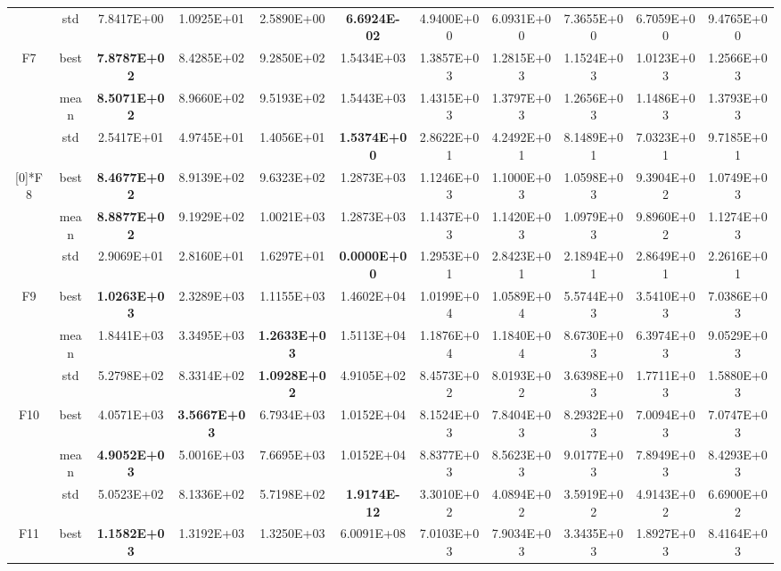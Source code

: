 \documentclass{wzuthesis}
\begin{document}
\begin{longtable}{ccccccccccc}
          & std   & 7.8417E+00 & 1.0925E+01 & 2.5890E+00 & \textbf{6.6924E-02} & 4.9400E+00 & 6.0931E+00 & 7.3655E+00 & 6.7059E+00 & 9.4765E+00 \\
    \multirow{3}[0]{*}{F7} & best  & \textbf{7.8787E+02} & 8.4285E+02 & 9.2850E+02 & 1.5434E+03 & 1.3857E+03 & 1.2815E+03 & 1.1524E+03 & 1.0123E+03 & 1.2566E+03 \\
          & mean  & \textbf{8.5071E+02} & 8.9660E+02 & 9.5193E+02 & 1.5443E+03 & 1.4315E+03 & 1.3797E+03 & 1.2656E+03 & 1.1486E+03 & 1.3793E+03 \\
          & std   & 2.5417E+01 & 4.9745E+01 & 1.4056E+01 & \textbf{1.5374E+00} & 2.8622E+01 & 4.2492E+01 & 8.1489E+01 & 7.0323E+01 & 9.7185E+01 \\
          \vspace*{1\baselineskip} 
    \multirow{3}[0]{*}{F8} & best  & \textbf{8.4677E+02} & 8.9139E+02 & 9.6323E+02 & 1.2873E+03 & 1.1246E+03 & 1.1000E+03 & 1.0598E+03 & 9.3904E+02 & 1.0749E+03 \\
          & mean  & \textbf{8.8877E+02} & 9.1929E+02 & 1.0021E+03 & 1.2873E+03 & 1.1437E+03 & 1.1420E+03 & 1.0979E+03 & 9.8960E+02 & 1.1274E+03 \\
          & std   & 2.9069E+01 & 2.8160E+01 & 1.6297E+01 & \textbf{0.0000E+00} & 1.2953E+01 & 2.8423E+01 & 2.1894E+01 & 2.8649E+01 & 2.2616E+01 \\
    \multirow{3}[0]{*}{F9} & best  & \textbf{1.0263E+03} & 2.3289E+03 & 1.1155E+03 & 1.4602E+04 & 1.0199E+04 & 1.0589E+04 & 5.5744E+03 & 3.5410E+03 & 7.0386E+03 \\
          & mean  & 1.8441E+03 & 3.3495E+03 & \textbf{1.2633E+03} & 1.5113E+04 & 1.1876E+04 & 1.1840E+04 & 8.6730E+03 & 6.3974E+03 & 9.0529E+03 \\
          & std   & 5.2798E+02 & 8.3314E+02 & \textbf{1.0928E+02} & 4.9105E+02 & 8.4573E+02 & 8.0193E+02 & 3.6398E+03 & 1.7711E+03 & 1.5880E+03 \\
    \multirow{3}[0]{*}{F10} & best  & 4.0571E+03 & \textbf{3.5667E+03} & 6.7934E+03 & 1.0152E+04 & 8.1524E+03 & 7.8404E+03 & 8.2932E+03 & 7.0094E+03 & 7.0747E+03 \\
          & mean  & \textbf{4.9052E+03} & 5.0016E+03 & 7.6695E+03 & 1.0152E+04 & 8.8377E+03 & 8.5623E+03 & 9.0177E+03 & 7.8949E+03 & 8.4293E+03 \\
          & std   & 5.0523E+02 & 8.1336E+02 & 5.7198E+02 & \textbf{1.9174E-12} & 3.3010E+02 & 4.0894E+02 & 3.5919E+02 & 4.9143E+02 & 6.6900E+02 \\
    \multirow{3}[0]{*}{F11} & best  & \textbf{1.1582E+03} & 1.3192E+03 & 1.3250E+03 & 6.0091E+08 & 7.0103E+03 & 7.9034E+03 & 3.3435E+03 & 1.8927E+03 & 8.4164E+03 \\

\end{longtable}
\end{document}
